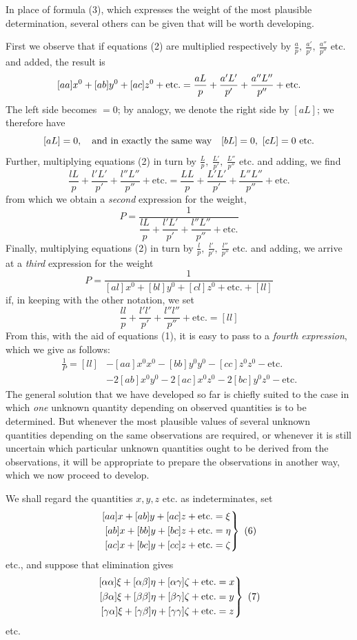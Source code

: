 In place of formula (3), which expresses the weight of the most plausible determination, several others can be given that will be worth developing.

First we observe that if equations (2) are multiplied respectively by \(\frac ap,\ \frac{a'}{p'},\ \frac{a''}{p''}\) etc. and added, the result is
\[\relax
[aa]x^0+[ab]y^0+[ac]z^0+\text{etc.}=\frac{aL}{p}+\frac{a'L'}{p'}+\frac{a''L''}{p''}+\text{etc.}
\]
The left side becomes \(=0\); by analogy, we denote the right side by \([aL]\); we therefore have
\[\relax
[aL]=0,\quad\text{and in exactly the same way}\quad[bL]=0,\ [cL]=0\ \text{etc.}
\]
Further, multiplying equations (2) in turn by \(\frac Lp,\ \frac{L'}{p'},\ \frac{L''}{p''}\) etc. and adding, we find
\[
\frac{lL}{p}+\frac{l'L'}{p'}+\frac{l''L''}{p''}+\text{etc.}=\frac{LL}{p}+\frac{L'L'}{p'}+\frac{L''L''}{p''}+\text{etc.}
\]
from which we obtain a \textit{second} expression for the weight,
\[
P=\frac{1}{\dfrac{lL}{p}+\dfrac{l'L'}{p'}+\dfrac{l''L''}{p''}+\text{etc.}}
\]
Finally, multiplying equations (2) in turn by \(\frac lp,\ \frac{l'}{p'},\ \frac{l''}{p''}\) etc. and adding, we arrive at a \textit{third} expression for the weight
\[
P=\frac{1}{[al]x^0+[bl]y^0+[cl]z^0+\text{etc.}+[ll]}
\]
if, in keeping with the other notation, we set
\[
\frac{ll}{p}+\frac{l'l'}{p'}+\frac{l''l''}{p''}+\text{etc.}=[ll]
\]
From this, with the aid of equations (1), it is easy to pass to a \textit{fourth expression}, which we give as follows:
\[
\begin{aligned}
\frac1P=[ll]&-[aa]x^0x^0-[bb]y^0y^0-[cc]z^0z^0-\text{etc.}\\
&-2[ab]x^0y^0-2[ac]x^0z^0-2[bc]y^0z^0-\text{etc.}
\end{aligned}
\]
The general solution that we have developed so far is chiefly suited to the case in which \textit{one} unknown quantity depending on observed quantities is to be determined. But whenever the most plausible values of several unknown quantities depending on the same observations are required, or whenever it is still uncertain which particular unknown quantities ought to be derived from the observations, it will be appropriate to prepare the observations in another way, which we now proceed to develop.

We shall regard the quantities \(x,y,z\) etc. as indeterminates, set
\[
\left.\begin{aligned}\relax
[aa]x+[ab]y+[ac]z+\text{etc.}&=\xi\\
[ab]x+[bb]y+[bc]z+\text{etc.}&=\eta\\
[ac]x+[bc]y+[cc]z+\text{etc.}&=\zeta
\end{aligned}\right\}\ (6)
\]
etc., and suppose that elimination gives
\[
\left.\begin{aligned}\relax
[\alpha\alpha]\xi+[\alpha\beta]\eta+[\alpha\gamma]\zeta+\text{etc.}&=x\\
[\beta\alpha]\xi+[\beta\beta]\eta+[\beta\gamma]\zeta+\text{etc.}&=y\\
[\gamma\alpha]\xi+[\gamma\beta]\eta+[\gamma\gamma]\zeta+\text{etc.}&=z
\end{aligned}\right\}\ (7)
\]
etc.

